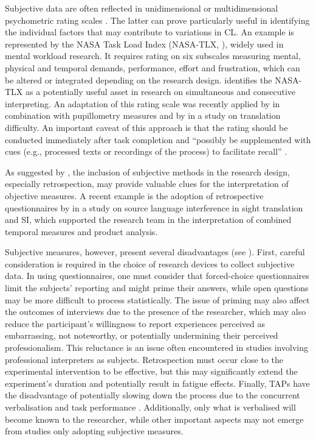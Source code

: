 Subjective data are often reflected in unidimensional or multidimensional psychometric rating scales \citep[648]{chen_construct_2017}. The latter can prove particularly useful in identifying the individual factors that may contribute to variations in CL. An example is represented by the NASA Task Load Index (NASA-TLX, \citealt{hart_development_1988}), widely used in mental workload research. It requires rating on six subscales measuring mental, physical and temporal demands, performance, effort and frustration, which can be altered or integrated depending on the research design. \citet{chen_construct_2017} identifies the NASA-TLX as a potentially useful asset in research on simultaneous and consecutive interpreting. An adaptation of this rating scale was recently applied by \citet{gieshoff_impact_2018} in combination with pupillometry measures and by \citet{sun_measuring_2014} in a study on translation difficulty. An important caveat of this approach is that the rating should be conducted immediately after task completion and ``possibly be supplemented with cues (e.g., processed texts or recordings of the process) to facilitate recall'' \citep[224]{ehrensberger-dow_cognitive_2020}.

As suggested by \citet[275]{gilelei_translation_2020}, the inclusion of subjective methods in the research design, especially retrospection, may provide valuable clues for the interpretation of objective measures. A recent example is the adoption of retrospective questionnaires by \citet{chmiel_eye_2020} in a study on source language interference in sight translation and SI, which supported the research team in the interpretation of combined temporal measures and product analysis.

Subjective measures, however, present several disadvantages (see \citealt{ehrensberger-dow_cognitive_2020}). First, careful consideration is required in the choice of research devices to collect subjective data. In using questionnaires, one must consider that forced-choice questionnaires limit the subjects' reporting and might prime their answers, while open questions may be more difficult to process statistically. The issue of priming may also affect the outcomes of interviews due to the presence of the researcher, which may also reduce the participant's willingness to report experiences perceived as embarrassing, not noteworthy, or potentially undermining their perceived professionalism. This reluctance is an issue often encountered in studies involving professional interpreters as subjects. Retrospection must occur close to the experimental intervention to be effective, but this may significantly extend the experiment's duration and potentially result in fatigue effects. Finally, TAPs have the disadvantage of potentially slowing down the process due to the concurrent verbalisation and task performance \citep{jakobsen2003effects}. Additionally, only what is verbalised will become known to the researcher, while other important aspects may not emerge from studies only adopting subjective measures.

